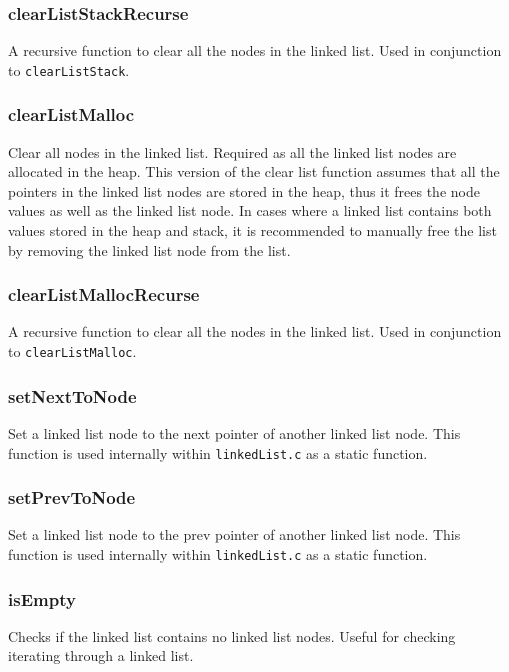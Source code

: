 \documentclass[a4paper, 12pt, titlepage]{article}
\newcommand{\code}[1]{\small\texttt{#1}\normalsize}
\begin{document}
\subsubsection{clearListStackRecurse}

A recursive function to clear all the nodes in the linked list. Used in
conjunction to \code{clearListStack}.

\subsubsection{clearListMalloc}

Clear all nodes in the linked list. Required as all the linked list nodes are
allocated in the heap. This version of the clear list function assumes that
all the pointers in the linked list nodes are stored in the heap, thus it
frees the node values as well as the linked list node. In cases where a
linked list contains both values stored in the heap and stack, it is
recommended to manually free the list by removing the linked list node from
the list.

\subsubsection{clearListMallocRecurse}

A recursive function to clear all the nodes in the linked list. Used in
conjunction to \code{clearListMalloc}.

\subsubsection{setNextToNode}

Set a linked list node to the next pointer of another linked list node. This
function is used internally within \code{linkedList.c} as a static function.

\subsubsection{setPrevToNode}

Set a linked list node to the prev pointer of another linked list node. This
function is used internally within \code{linkedList.c} as a static function.

\subsubsection{isEmpty}

Checks if the linked list contains no linked list nodes. Useful for checking
iterating through a linked list.
\end{document}
